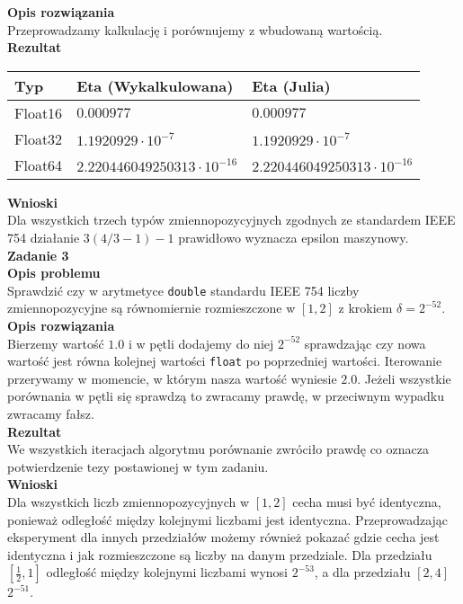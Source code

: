 \documentclass{article}
\begin{document}
\noindent \textbf{Opis rozwiązania} \\
Przeprowadzamy kalkulację i porównujemy z wbudowaną wartością. \\

\noindent \textbf{Rezultat}

\begin{center}
\begin{tabular}{|l|l|l|}
    \hline
    \textbf{Typ} & \textbf{Eta (Wykalkulowana)} & \textbf{Eta (Julia)} \\
    \hline
    Float16 & $0.000977$ & $0.000977$ \\ 
    \hline
    Float32 & $1.1920929\cdot10^{-7}$ & $1.1920929\cdot10^{-7}$ \\ 
    \hline
    Float64 & $2.220446049250313\cdot10^{-16}$ & $2.220446049250313\cdot10^{-16}$ \\ 
    \hline
\end{tabular}
\end{center}

\noindent \textbf{Wnioski} \\
Dla wszystkich trzech typów zmiennopozycyjnych zgodnych ze standardem IEEE 754
działanie $3(4/3 - 1) - 1$ prawidłowo wyznacza epsilon maszynowy. \\

\noindent \textbf{Zadanie 3} \\[\baselineskip]
\noindent \textbf{Opis problemu} \\
Sprawdzić czy w arytmetyce \texttt{double} standardu IEEE 754 liczby zmiennopozycyjne są
równomiernie rozmieszczone w $[1,2]$ z krokiem $\delta=2^{-52}$. \\

\noindent \textbf{Opis rozwiązania} \\
Bierzemy wartość $1.0$ i w pętli dodajemy do niej $2^{-52}$ sprawdzając
czy nowa wartość jest równa kolejnej wartości \texttt{float} po poprzedniej wartości.
Iterowanie przerywamy w momencie, w którym nasza wartość wyniesie $2.0$. Jeżeli
wszystkie porównania w pętli się sprawdzą to zwracamy prawdę, w przeciwnym wypadku
zwracamy fałsz. \\

\noindent \textbf{Rezultat} \\
We wszystkich iteracjach algorytmu porównanie zwróciło prawdę co oznacza potwierdzenie
tezy postawionej w tym zadaniu. \\

\noindent \textbf{Wnioski} \\
Dla wszystkich liczb zmiennopozycyjnych w $[1,2]$ cecha musi być identyczna, ponieważ
odległość między kolejnymi liczbami jest identyczna. Przeprowadzając eksperyment dla innych
przedziałów możemy również pokazać gdzie cecha jest identyczna i jak rozmieszczone
są liczby na danym przedziale. Dla przedziału $[\frac{1}{2}, 1]$ odległość między
kolejnymi liczbami wynosi $2^{-53}$, a dla przedziału $[2, 4]$ $2^{-51}$. \\
\end{document}
